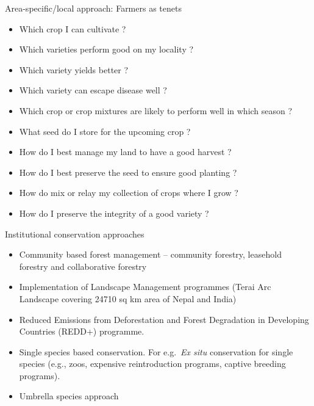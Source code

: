 \documentclass[
  ignorenonframetext,
  aspectratio=169]{beamer}
\providecommand{\tightlist}{%
  \setlength{\itemsep}{0pt}\setlength{\parskip}{0pt}}
\begin{document}
\begin{frame}{Area-specific/local approach: Farmers as tenets}
\protect\hypertarget{area-specificlocal-approach-farmers-as-tenets}{}
\begin{itemize}
\tightlist
\item
  Which crop I can cultivate ?
\item
  Which varieties perform good on my locality ?
\item
  Which variety yields better ?
\item
  Which variety can escape disease well ?
\item
  Which crop or crop mixtures are likely to perform well in which season
  ?
\item
  What seed do I store for the upcoming crop ?
\item
  How do I best manage my land to have a good harvest ?
\item
  How do I best preserve the seed to ensure good planting ?
\item
  How do mix or relay my collection of crops where I grow ?
\item
  How do I preserve the integrity of a good variety ?
\end{itemize}
\end{frame}

\begin{frame}{Institutional conservation approaches}
\protect\hypertarget{institutional-conservation-approaches}{}
\begin{itemize}
\tightlist
\item
  Community based forest management -- community forestry, leasehold
  forestry and collaborative forestry
\item
  Implementation of Landscape Management programmes (Terai Arc Landscape
  covering 24710 sq km area of Nepal and India)
\item
  Reduced Emissions from Deforestation and Forest Degradation in
  Developing Countries (REDD+) programme.
\item
  Single species based conservation. For e.g.~\emph{Ex situ}
  conservation for single species (e.g., zoos, expensive reintroduction
  programs, captive breeding programs).
\item
  Umbrella species approach
\end{itemize}
\end{frame}
\end{document}
